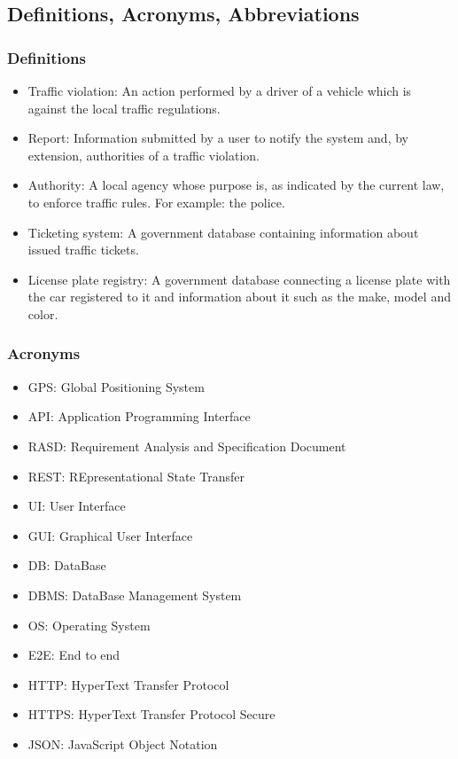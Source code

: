 \subsection{Definitions, Acronyms, Abbreviations}
\subsubsection{Definitions}

\begin{itemize}
    \item
    Traffic violation: An action performed by a driver of a vehicle which is against the local traffic regulations.
    \item
    Report: Information submitted by a user to notify the system and, by extension, authorities of a traffic violation.
    \item
    Authority: A local agency whose purpose is, as indicated by the current law, to enforce traffic rules. For example: the police.
    \item
    Ticketing system: A government database containing information about issued traffic tickets.
    \item
    License plate registry: A government database connecting a license plate with the car registered to it and information about it such as the make, model and color.
\end{itemize}


\subsubsection{Acronyms}
\begin{itemize}
    \item
    GPS: Global Positioning System
    \item
    API: Application Programming Interface
    \item
    RASD: Requirement Analysis and Specification Document
    \item
    REST: REpresentational State Transfer
    \item
    UI: User Interface
    \item
    GUI: Graphical User Interface
    \item
    DB: DataBase
    \item
    DBMS: DataBase Management System
    \item
    OS: Operating System
    \item
    E2E: End to end
    \item
    HTTP: HyperText Transfer Protocol
    \item
    HTTPS: HyperText Transfer Protocol Secure
    \item
    JSON: JavaScript Object Notation
\end{itemize}


